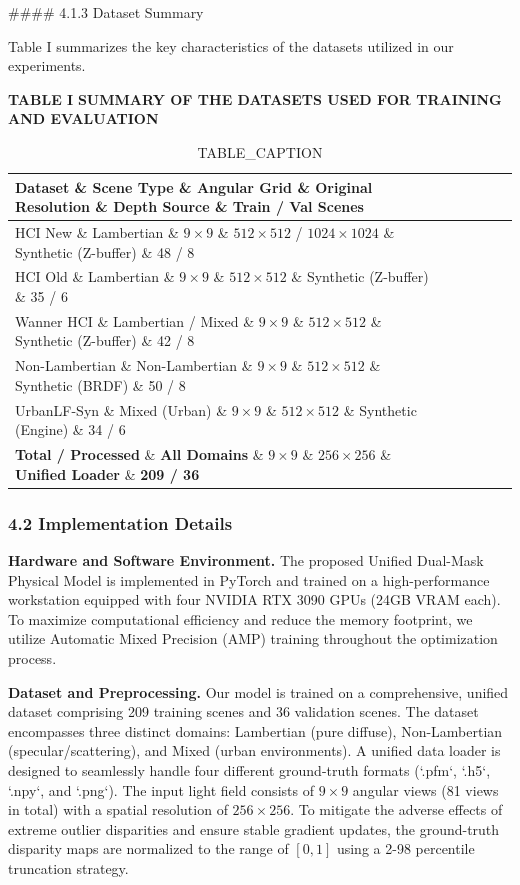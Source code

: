 \#\#\#\# 4.1.3 Dataset Summary

Table I summarizes the key characteristics of the datasets utilized in our experiments.

\textbf{TABLE I}
\textbf{SUMMARY OF THE DATASETS USED FOR TRAINING AND EVALUATION}

\begin{table}[htbp]
\centering
\caption{TABLE_CAPTION}
\begin{tabular}{llllll}
\toprule
Dataset \& Scene Type \& Angular Grid \& Original Resolution \& Depth Source \& Train / Val Scenes \\
\midrule
HCI New \& Lambertian \& $9 \times 9$ \& $512 \times 512$ / $1024 \times 1024$ \& Synthetic (Z-buffer) \& 48 / 8 \\
HCI Old \& Lambertian \& $9 \times 9$ \& $512 \times 512$ \& Synthetic (Z-buffer) \& 35 / 6 \\
Wanner HCI \& Lambertian / Mixed \& $9 \times 9$ \& $512 \times 512$ \& Synthetic (Z-buffer) \& 42 / 8 \\
Non-Lambertian \& Non-Lambertian \& $9 \times 9$ \& $512 \times 512$ \& Synthetic (BRDF) \& 50 / 8 \\
UrbanLF-Syn \& Mixed (Urban) \& $9 \times 9$ \& $512 \times 512$ \& Synthetic (Engine) \& 34 / 6 \\
\textbf{Total / Processed} \& \textbf{All Domains} \& \textbf{$9 \times 9$} \& \textbf{$256 \times 256$} \& \textbf{Unified Loader} \& \textbf{209 / 36} \\
\bottomrule
\end{tabular}
\end{table}
\subsubsection{4.2 Implementation Details}

\textbf{Hardware and Software Environment.} 
The proposed Unified Dual-Mask Physical Model is implemented in PyTorch and trained on a high-performance workstation equipped with four NVIDIA RTX 3090 GPUs (24GB VRAM each). To maximize computational efficiency and reduce the memory footprint, we utilize Automatic Mixed Precision (AMP) training throughout the optimization process. 

\textbf{Dataset and Preprocessing.} 
Our model is trained on a comprehensive, unified dataset comprising 209 training scenes and 36 validation scenes. The dataset encompasses three distinct domains: Lambertian (pure diffuse), Non-Lambertian (specular/scattering), and Mixed (urban environments). A unified data loader is designed to seamlessly handle four different ground-truth formats (`.pfm`, `.h5`, `.npy`, and `.png`). The input light field consists of $9 \times 9$ angular views (81 views in total) with a spatial resolution of $256 \times 256$. To mitigate the adverse effects of extreme outlier disparities and ensure stable gradient updates, the ground-truth disparity maps are normalized to the range of $[0, 1]$ using a 2-98 percentile truncation strategy.

